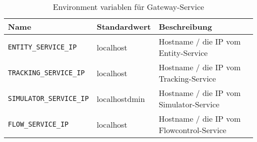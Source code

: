 \begin{table}[h]
	\begin{tabular}{|l|l|l|}
		\hline
		Name & Standardwert & Beschreibung \\ \hline
		\verb|ENTITY_SERVICE_IP| & localhost &  Hostname / die IP vom Entity-Service \\ \hline
		\verb|TRACKING_SERVICE_IP| & localhost  &  Hostname / die IP vom Tracking-Service  \\ \hline
		\verb|SIMULATOR_SERVICE_IP| & localhostdmin &  Hostname / die IP vom Simulator-Service  \\ \hline
		\verb|FLOW_SERVICE_IP| & localhost &  Hostname / die IP vom Flowcontrol-Service  \\ \hline
	\end{tabular}
	\caption{Environment variablen für Gateway-Service }
\end{table}

